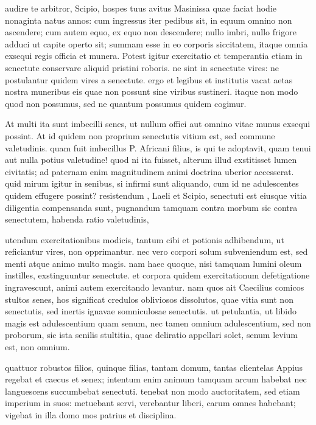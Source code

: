  audire te arbitror, Scipio, hospes tuus avitus Masinissa quae faciat hodie nonaginta natus annos: cum ingressus iter pedibus sit, in equum omnino non ascendere; cum autem equo, ex equo non descendere; nullo imbri, nullo frigore adduci ut capite operto sit; summam esse in eo corporis siccitatem, itaque omnia exsequi regis officia et munera. Potest igitur exercitatio et temperantia etiam in senectute conservare aliquid pristini roboris. ne sint in senectute vires: ne postulantur quidem vires a senectute. ergo et legibus et institutis vacat aetas nostra muneribus eis quae non possunt sine viribus sustineri. itaque non modo quod non possumus, sed ne quantum possumus quidem cogimur.

 At multi ita sunt imbecilli senes, ut nullum offici aut omnino vitae munus exsequi possint. At id quidem non proprium senectutis vitium est, sed commune valetudinis. quam fuit imbecillus P. Africani filius, is qui te adoptavit, quam tenui aut nulla potius valetudine! quod ni ita fuisset, alterum illud exstitisset lumen civitatis; ad paternam enim magnitudinem animi doctrina uberior accesserat. quid mirum igitur in senibus, si infirmi sunt aliquando, cum id ne adulescentes quidem effugere possint? resistendum , Laeli et Scipio, senectuti est eiusque vitia diligentia compensanda sunt, pugnandum tamquam contra morbum sic contra senectutem, habenda ratio valetudinis,

 utendum exercitationibus modicis, tantum cibi et potionis adhibendum, ut reficiantur vires, non opprimantur. nec vero corpori solum subveniendum est, sed menti atque animo multo magis. nam haec quoque, nisi tamquam lumini oleum instilles, exstinguuntur senectute. et corpora quidem exercitationum defetigatione ingravescunt, animi autem exercitando levantur. nam quos ait Caecilius comicos stultos senes, hos significat credulos obliviosos dissolutos, quae vitia sunt non senectutis, sed inertis ignavae somniculosae senectutis. ut petulantia, ut libido magis est adulescentium quam senum, nec tamen omnium adulescentium, sed non proborum, sic ista senilis stultitia, quae deliratio appellari solet, senum levium est, non omnium.

 quattuor robustos filios, quinque filias, tantam domum, tantas clientelas Appius regebat et caecus et senex; intentum enim animum tamquam arcum habebat nec languescens succumbebat senectuti. tenebat non modo auctoritatem, sed etiam imperium in suos: metuebant servi, verebantur liberi, carum omnes habebant; vigebat in illa domo mos patrius et disciplina.

